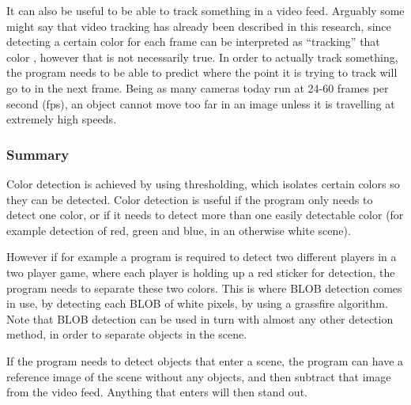 It can also be useful to be able to track something in a video feed. Arguably some might say that video tracking has already been described in this research, since detecting a certain color for each frame can be interpreted as “tracking” that color \parencite{Moeslund2012}, however that is not necessarily true. In order to actually track something, the program needs to be able to predict where the point it is trying to track will go to in the next frame. Being as many cameras today run at 24-60 frames per second (fps), an object cannot move too far in an image unless it is travelling at extremely high speeds.

\subsubsection{Summary}
Color detection is achieved by using thresholding, which isolates certain colors so they can be detected. Color detection is useful if the program only needs to detect one color, or if it needs to detect more than one easily detectable color (for example detection of red, green and blue, in an otherwise white scene).

However if for example a program is required to detect two different players in a two player game, where each player is holding up a red sticker for detection, the program needs to separate these two colors. This is where BLOB detection comes in use, by detecting each BLOB of white pixels, by using a grassfire algorithm. Note that BLOB detection can be used in turn with almost any other detection method, in order to separate objects in the scene.

If the program needs to detect objects that enter a scene, the program can have a reference image of the scene without any objects, and then subtract that image from the video feed. Anything that enters will then stand out. \parencite{Moeslund2012}
